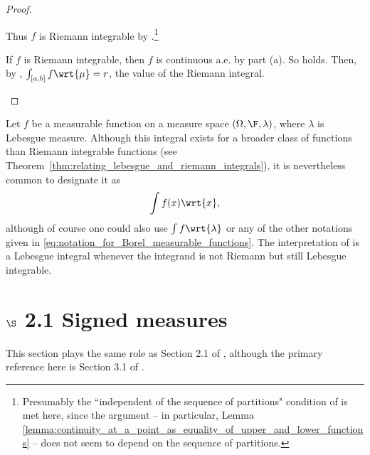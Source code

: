 \documentclass{article} %
\newcommand{\dmu}{\wrt{\mu}}
\begin{document}
\begin{proof}
\begin{alphabate}
\begin{itemize}
Thus $f$ is Riemann integrable by .\footnote{Presumably the ``independent of the sequence of partitions" condition of  is met here, since the argument -- in particular, Lemma  \ref{lemma:continuity_at_a_point_as_equality_of_upper_and_lower_functions} -- does not seem to depend on the sequence of partitions.}
\end{itemize}
\item If $f$ is Riemann integrable, then $f$ is continuous a.e. by part (a).   So  holds.  Then, by , $\int_{[a,b]} f \dmu = r$, the value of the Riemann integral. 
\end{alphabate}
\end{proof}

\begin{notation}
Let $f$ be a measurable function on a measure space $(\Omega, \F, \lambda)$, where $\lambda$ is Lebesgue measure. 
Although this integral exists for a broader class of functions than Riemann integrable functions (see Theorem~\ref{thm:relating_lebesgue_and_riemann_integrals}), it is nevertheless common to designate it as 
\begin{align}
\int f(x) \wrt{x},
\label{eqn:reimann_notation_for_lebesgue_integral}	
\end{align}
although of course one could also use $\int f \wrt{\lambda}$ or any of the other notations given in \eqref{eq:notation_for_Borel_measurable_functions}. The interpretation of  is a Lebesgue integral whenever the integrand is not Riemann but still Lebesgue integrable. 
\label{notation:reusing_Reimann_notation_for_Lebesgue_integrals}
\end{notation}

\section{$\S$ 2.1 Signed measures} \label{sec:signed_measures}

This section plays the same role as Section 2.1 of \cite{ash2000probability}, although the primary reference here is Section 3.1 of \cite{folland1999real}.
\end{document}
